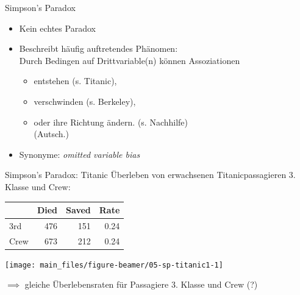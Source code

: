 \documentclass[
  10pt,
  ignorenonframetext,
]{beamer}
\providecommand{\tightlist}{%
  \setlength{\itemsep}{0pt}\setlength{\parskip}{0pt}}
\begin{document}
\begin{frame}{Simpson's Paradox}
\label{simpsons-paradox}
\begin{itemize}
\tightlist
\item
  Kein echtes Paradox
\item
  Beschreibt häufig auftretendes Phänomen:\\
  Durch Bedingen auf Drittvariable(n) können Assoziationen

  \begin{itemize}
  \tightlist
  \item
    entstehen (s. Titanic),
  \item
    verschwinden (s. Berkeley),
  \item
    oder ihre Richtung ändern. (s. Nachhilfe)\\
    (Autsch.)
  \end{itemize}
\item
  Synonyme: \emph{omitted variable bias}
\end{itemize}
\end{frame}

\begin{frame}{Simpson's Paradox: Titanic}
\label{simpsons-paradox-titanic}
Überleben von erwachsenen Titanicpassagieren 3. Klasse und Crew:

\scriptsize

\begin{tabular}{l|r|r||r}

  & Died & Saved & Rate\\
\hline
3rd & 476 & 151 & 0.24\\
\hline
Crew & 673 & 212 & 0.24\\
\end{tabular}
\scriptsize

\begin{center}\texttt{[image: main\_files/figure-beamer/05-sp-titanic1-1]} \end{center}

\normalsize

\normalsize

\(\implies\) gleiche Überlebensraten für Passagiere 3. Klasse und Crew
(?)
\end{frame}
\end{document}
